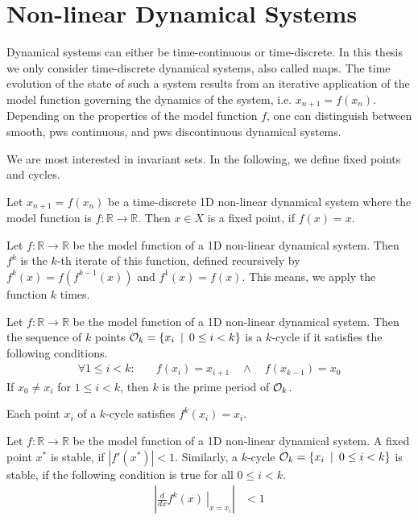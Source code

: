 \section{Non-linear Dynamical Systems}

Dynamical systems can either be time-continuous or time-discrete.
In this thesis we only consider time-discrete dynamical systems, also called maps.
The time evolution of the state of such a system results from an iterative application of the model function governing the dynamics of the system, i.e. $x_{n+1} = f(x_n)$.
Depending on the properties of the model function $f$, one can distinguish between smooth, \gls{pws} continuous, and \gls{pws} discontinuous dynamical systems.

We are most interested in invariant sets.
In the following, we define fixed points and cycles.

\begin{definition}
	Let $x_{n+1} = f(x_n)$ be a time-discrete 1D non-linear dynamical system where the model function is $f: \mathbb{R} \to \mathbb{R}$.
	Then $x \in X$ is a fixed point, if $f(x) = x$.
\end{definition}

\begin{definition}
	Let $f: \mathbb{R} \to \mathbb{R}$ be the model function of a 1D non-linear dynamical system.
	Then $f^k$ is the $k$-th iterate of this function, defined recursively by $f^k(x) = f\left(f^{k-1}(x)\right)$ and $f^1(x) = f(x)$.
	This means, we apply the function $k$ times.
\end{definition}

\begin{definition}[Cycle]
	Let $f: \mathbb{R} \to \mathbb{R}$ be the model function of a 1D non-linear dynamical system.
	Then the sequence of $k$ points $\mathcal{O}_k = \{x_i \:\mid\: 0 \leq i < k\}$ is a $k$-cycle if it satisfies the following conditions.
	\begin{align}
		\forall 1 \leq i < k: \quad & f(x_i) = x_{i+1} \quad \land \quad f(x_{k-1}) = x_0
	\end{align}
	If $x_0 \neq x_i$ for $1 \leq i < k$, then $k$ is the prime period of $\mathcal{O}_k$.
\end{definition}

Each point $x_i$ of a $k$-cycle satisfies $f^k(x_i) = x_i$.

\begin{definition}[Stability]
	Let $f: \mathbb{R} \to \mathbb{R}$ be the model function of a 1D non-linear dynamical system.
	A fixed point $x^*$ is stable, if $|f'(x^*)| < 1$.
	Similarly, a $k$-cycle $\mathcal{O}_k = \{x_i \:\mid\: 0 \leq i < k\}$ is stable, if the following condition is true for all $0 \leq i < k$.
	\begin{align}
		\left| \left. \frac{d}{dx}f^k(x) \:\right|_{x = x_i}\right| & < 1
	\end{align}
\end{definition}

